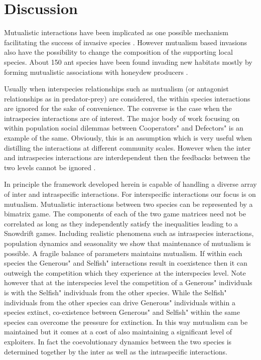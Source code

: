 \documentclass[12pt]{article}
\begin{document}
\section{Discussion}

Mutualistic interactions have been implicated as one possible mechanism facilitating the success of invasive species \citep{richardson:BR:2000}.
However mutualism based invasions also have the possibility to change the composition of the supporting local species.
About 150 ant species have been found invading new habitats mostly by forming mutualistic associations with honeydew producers \citep{mcglynn:JB:1999}.

Usually when interspecies relationships such as mutualism (or antagonist relationships as in predator-prey) are considered, the within species interactions are ignored for the sake of convenience.
The converse is the case when the intraspecies interactions are of interest.
The major body of work focusing on within population social dilemmas between Cooperators" and Defectors" is an example of the same.
Obviously, this is an assumption which is very useful when distilling the interactions at different community scales.
However when the inter and intraspecies interactions are interdependent then the feedbacks between the two levels cannot be ignored \citep{schluter:PlosB:2012}.

In principle the framework developed herein is capable of handling a diverse array of inter and intraspecific interactions.
For interspecific interactions our focus is on mutualism.
Mutualistic interactions between two species can be represented by a bimatrix game.
The components of each of the two game matrices need not be correlated as long as they independently satisfy the inequalities leading to a Snowdrift games. Including realistic phenomena such as intraspecies interactions, population dynamics and seasonality we show that maintenance of mutualism is possible.
A fragile balance of parameters maintains mutualism. If within each species the Generous" and Selfish" interactions result in coexistence then it can outweigh the competition which they experience at the interspecies level.
Note however that at the interspecies level the competition of a Generous" individuals is with the Selfish" individuals from the other species. While the Selfish" individuals from the other species can drive Generous" individuals within a species extinct, co-existence between Generous" and Selfish" within the same species can overcome the pressure for extinction. In this way mutualism can be maintained but it comes at a cost of also maintaining a significant level of exploiters. In fact the coevolutionary dynamics between the two species is determined together by the inter as well as the intraspecific interactions.
\end{document}
